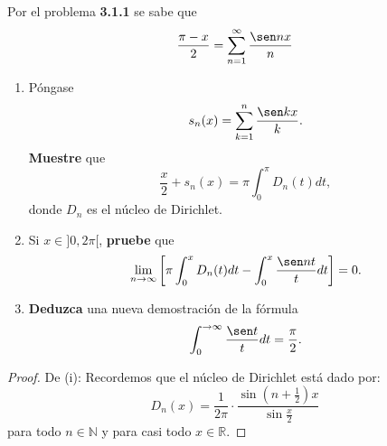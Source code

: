 \documentclass[12pt]{report}
\theoremstyle{largebreak}
\begin{document}
    \begin{excer}
        Por el problema \textbf{3.1.1} se sabe que
        \begin{equation*}
            \frac{\pi-x}{2}=\sum_{ n=1}^\infty\frac{\sen nx}{n}
        \end{equation*}
        \begin{enumerate}
            \item Póngase
            \begin{equation*}
                s_n(x)=\sum_{  k=1}^n \frac{\sen kx}{k}.
            \end{equation*}
            \textbf{Muestre} que
            \begin{equation*}
                \frac{x}{2}+s_n(x)=\pi\int_0^\pi D_n(t)dt,
            \end{equation*}
            donde $D_n$ es el núcleo de Dirichlet.
            \item Si $x\in]0,2\pi[$, \textbf{pruebe} que
            \begin{equation*}
                \lim_{ n\rightarrow\infty}\left[\pi\int_0^x D_n(t)dt- \int_0^x\frac{\sen nt}{t}dt \right]=0.
            \end{equation*}
            \item \textbf{Deduzca} una nueva demostración de la fórmula
            \begin{equation*}
                \int_0^{\rightarrow\infty}\frac{\sen t}{t}dt=\frac{\pi}{2}.
            \end{equation*}
        \end{enumerate}
    \end{excer}

    \begin{proof}
        De (i): Recordemos que el núcleo de Dirichlet está dado por:
        \begin{equation*}
            D_n(x)=\frac{1}{2\pi}\cdot\frac{\sin\left(n+\frac{1}{2}\right)x}{\sin\frac{x}{2}}
        \end{equation*}
        para todo $n\in\mathbb{N}$ y para casi todo $x\in\mathbb{R}$.
    \end{proof}
\end{document}
